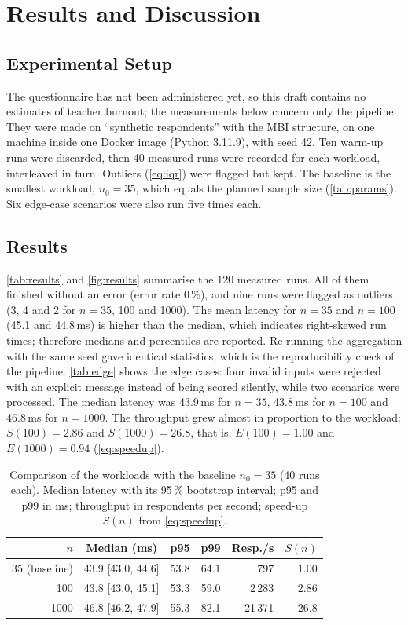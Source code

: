 \section{Results and Discussion}\label{sec:results}

\subsection{Experimental Setup}\label{sec:setup}
The questionnaire has not been administered yet, so this draft contains no
estimates of teacher burnout; the measurements below concern only the
pipeline. They were made on ``synthetic respondents'' with the MBI structure,
on one machine inside one Docker image (Python 3.11.9), with seed 42. Ten
warm-up runs were discarded, then 40 measured runs were recorded for each
workload, interleaved in turn. Outliers (\autoref{eq:iqr}) were flagged but kept. The baseline is the
smallest workload, $n_0=35$, which equals the planned sample size
(\autoref{tab:params}). Six edge-case scenarios were also run five times each.

\subsection{Results}\label{sec:res}
\autoref{tab:results} and \autoref{fig:results} summarise the 120 measured
runs. All of them finished without an error (error rate 0\,\%), and nine runs
were flagged as outliers (3, 4 and 2 for $n=35$, 100 and 1000). The mean latency
for $n=35$ and $n=100$ (45.1 and 44.8\,ms) is higher than the median, which
indicates right-skewed run times; therefore medians and percentiles are reported. Re-running the aggregation with the
same seed gave identical statistics, which is the reproducibility check of the pipeline. \autoref{tab:edge} shows the edge cases: four invalid
inputs were rejected with an explicit message instead of being scored silently,
while two scenarios were processed. The median latency was
43.9\,ms for $n=35$, 43.8\,ms for $n=100$ and 46.8\,ms for $n=1000$. The
throughput grew almost in proportion to the workload: $S(100)=2.86$ and
$S(1000)=26.8$, that is, $E(100)=1.00$ and $E(1000)=0.94$ (\autoref{eq:speedup}).

\begin{table}[b]
  \centering
  \caption{Comparison of the workloads with the baseline $n_0=35$ (40 runs
  each). Median latency with its 95\,\% bootstrap interval; p95 and p99 in ms;
  throughput in respondents per second; speed-up $S(n)$ from \autoref{eq:speedup}.}
  \label{tab:results}
  \footnotesize
  \setlength{\tabcolsep}{3pt}
  \begin{tabular}{@{}rcccrr@{}}
    \toprule
    $n$ & Median (ms) & p95 & p99 & Resp./s & $S(n)$ \\
    \midrule
    35 (baseline) & 43.9 [43.0, 44.6] & 53.8 & 64.1 & 797 & 1.00 \\
    100  & 43.8 [43.0, 45.1] & 53.3 & 59.0 & 2\,283 & 2.86 \\
    1000 & 46.8 [46.2, 47.9] & 55.3 & 82.1 & 21\,371 & 26.8 \\
    \bottomrule
  \end{tabular}
\end{table}


